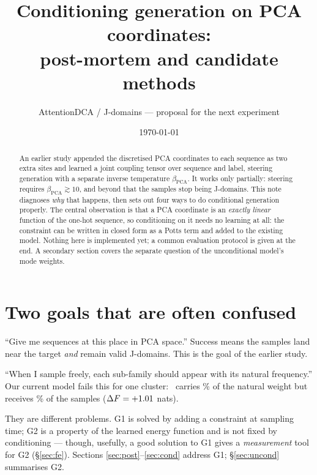 \documentclass[10pt,a4paper]{article}
\title{\vspace{-1.2cm}Conditioning generation on PCA coordinates:\\ post-mortem and candidate methods}
\author{AttentionDCA / J-domains --- proposal for the next experiment}
\date{\today}
\newcommand{\PCA}{\mathrm{PCA}}
\begin{document}
\maketitle

\begin{abstract}
\noindent
An earlier study appended the discretised PCA coordinates to each sequence as two extra sites and
learned a joint coupling tensor over sequence and label, steering generation with a separate
inverse temperature $\beta_{\PCA}$. It works only partially: steering requires
$\beta_{\PCA}\gtrsim10$, and beyond that the samples stop being J-domains. This note diagnoses
\emph{why} that happens, then sets out four ways to do conditional generation properly. The
central observation is that a PCA coordinate is an \emph{exactly linear} function of the one-hot
sequence, so conditioning on it needs no learning at all: the constraint can be written in closed
form as a Potts term and added to the existing model. Nothing here is implemented yet; a common
evaluation protocol is given at the end. A secondary section covers the separate question of the
unconditional model's mode weights.
\end{abstract}

\section{Two goals that are often confused}
\begin{description}[leftmargin=1.2em,itemsep=2pt]
\item[\textbf{(G1) Conditional generation.}] ``Give me sequences at this place in PCA space.''
  Success means the samples land near the target \emph{and} remain valid J-domains. This is the
  goal of the earlier study.
\item[\textbf{(G2) Correct mode weights.}] ``When I sample freely, each sub-family should appear
  with its natural frequency.'' Our current model fails this for one cluster: \MissCl\ carries
  \ClTest\% of the natural weight but receives \ClOne\% of the samples ($\Delta F=+1.01$ nats).
\end{description}
They are different problems. G1 is solved by adding a constraint at sampling time; G2 is a
property of the learned energy function and is not fixed by conditioning --- though, usefully, a
good solution to G1 gives a \emph{measurement} tool for G2 (\S\ref{sec:fe}). Sections
\ref{sec:post}--\ref{sec:cond} address G1; \S\ref{sec:uncond} summarises G2.
\end{document}
